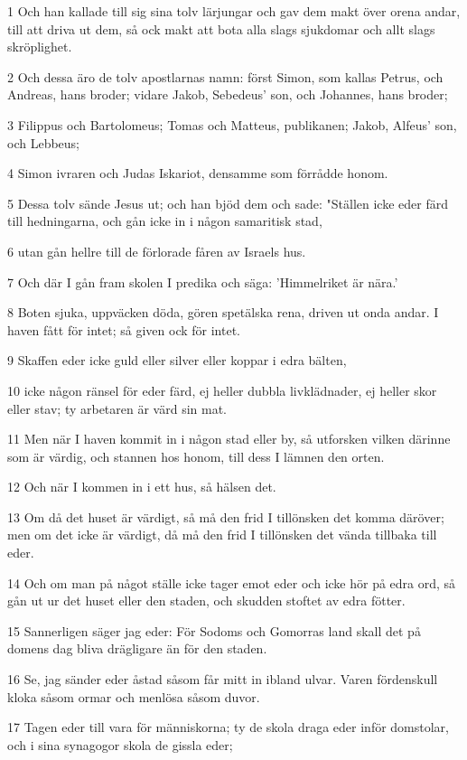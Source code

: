\par 1 Och han kallade till sig sina tolv lärjungar och gav dem makt över orena andar, till att driva ut dem, så ock makt att bota alla slags sjukdomar och allt slags skröplighet.
\par 2 Och dessa äro de tolv apostlarnas namn: först Simon, som kallas Petrus, och Andreas, hans broder; vidare Jakob, Sebedeus' son, och Johannes, hans broder;
\par 3 Filippus och Bartolomeus; Tomas och Matteus, publikanen; Jakob, Alfeus' son, och Lebbeus;
\par 4 Simon ivraren och Judas Iskariot, densamme som förrådde honom.
\par 5 Dessa tolv sände Jesus ut; och han bjöd dem och sade: "Ställen icke eder färd till hedningarna, och gån icke in i någon samaritisk stad,
\par 6 utan gån hellre till de förlorade fåren av Israels hus.
\par 7 Och där I gån fram skolen I predika och säga: 'Himmelriket är nära.'
\par 8 Boten sjuka, uppväcken döda, gören spetälska rena, driven ut onda andar. I haven fått för intet; så given ock för intet.
\par 9 Skaffen eder icke guld eller silver eller koppar i edra bälten,
\par 10 icke någon ränsel för eder färd, ej heller dubbla livklädnader, ej heller skor eller stav; ty arbetaren är värd sin mat.
\par 11 Men när I haven kommit in i någon stad eller by, så utforsken vilken därinne som är värdig, och stannen hos honom, till dess I lämnen den orten.
\par 12 Och när I kommen in i ett hus, så hälsen det.
\par 13 Om då det huset är värdigt, så må den frid I tillönsken det komma däröver; men om det icke är värdigt, då må den frid I tillönsken det vända tillbaka till eder.
\par 14 Och om man på något ställe icke tager emot eder och icke hör på edra ord, så gån ut ur det huset eller den staden, och skudden stoftet av edra fötter.
\par 15 Sannerligen säger jag eder: För Sodoms och Gomorras land skall det på domens dag bliva drägligare än för den staden.
\par 16 Se, jag sänder eder åstad såsom får mitt in ibland ulvar. Varen fördenskull kloka såsom ormar och menlösa såsom duvor.
\par 17 Tagen eder till vara för människorna; ty de skola draga eder inför domstolar, och i sina synagogor skola de gissla eder;
